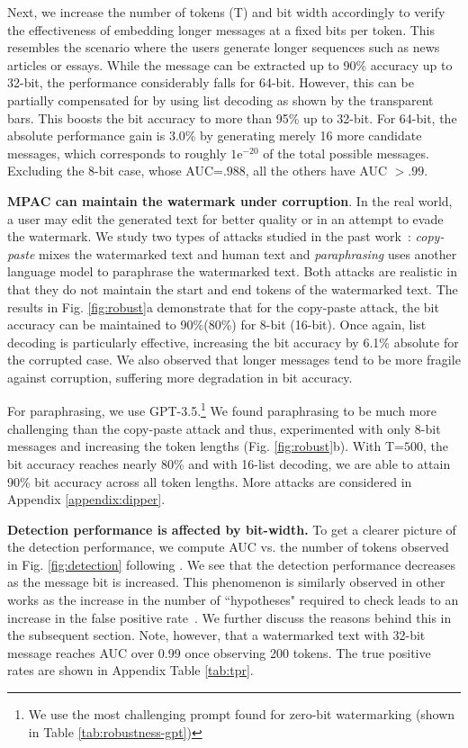 Next, we increase the number of tokens (T) and bit width accordingly to verify the effectiveness of embedding longer messages at a fixed bits per token. This resembles the scenario where the users generate longer sequences such as news articles or essays. While the message can be extracted up to 90\% accuracy up to 32-bit, the performance considerably falls for 64-bit. However, this can be partially compensated for by using list decoding as shown by the transparent bars. This boosts the bit accuracy to more than 95\% up to 32-bit. For 64-bit, the absolute performance gain is 3.0\% by generating merely 16 more candidate messages, which corresponds to roughly $1\mathrm{e}^{-20}$ of the total possible messages. Excluding the 8-bit case, whose AUC=$.988$, all the others have AUC $>.99$. 


\noindent\textbf{MPAC can maintain the watermark under corruption}. In the real world, a user may edit the generated text for better quality or in an attempt to evade the watermark. We study two types of attacks studied in the past work~\citep{kirchenbauer2023reliability}: \textit{copy-paste} mixes the watermarked text and human text and \textit{paraphrasing} uses another language model to paraphrase the watermarked text. Both attacks are realistic in that they do not maintain the start and end tokens of the watermarked text. The results in Fig. \ref{fig:robust}a demonstrate that for the copy-paste attack, the bit accuracy can be maintained to 90\%(80\%) for 8-bit (16-bit). Once again, list decoding is particularly effective, increasing the bit accuracy by 6.1\% absolute for the corrupted case. We also observed that longer messages tend to be more fragile against corruption, suffering more degradation in bit accuracy.


For paraphrasing, we use GPT-3.5.\footnote{We use the most challenging prompt found for zero-bit watermarking (shown in Table \ref{tab:robustness-gpt})} We found paraphrasing to be much more challenging than the copy-paste attack and thus, experimented with only 8-bit messages and increasing the token lengths (Fig. \ref{fig:robust}b). With T=$500$, the bit accuracy reaches nearly 80\% and with 16-list decoding, we are able to attain 90\% bit accuracy across all token lengths. More attacks are considered in Appendix \ref{appendix:dipper}.


\noindent\textbf{Detection performance is affected by bit-width.} 
To get a clearer picture of the detection performance, we compute AUC vs. the number of tokens observed in Fig. \ref{fig:detection} following \citet{kirchenbauer2023reliability}. We see that the detection performance decreases as the message bit is increased. This phenomenon is similarly observed in other works as the increase in the number of ``hypotheses" required to check leads to an increase in the false positive rate~\citep{fernandez2023stable}. We further discuss the reasons behind this in the subsequent section. Note, however, that a watermarked text with 32-bit message reaches AUC over 0.99 once observing 200 tokens. The true positive rates are shown in Appendix Table \ref{tab:tpr}.

